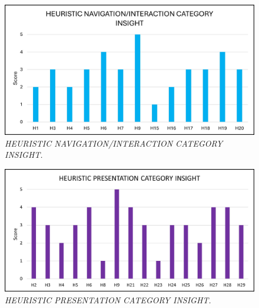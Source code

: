 \begin{figure}[h]
	\includegraphics[width=\textwidth]{Visual_illustration_4.jpg}
	\caption{\textit{HEURISTIC NAVIGATION/INTERACTION CATEGORY INSIGHT.}}
	\label{fig:label4}
\end{figure}
\begin{figure}[h]
	\includegraphics[width=\textwidth]{Visual_illustration_5.jpg}
	\caption{\textit{HEURISTIC PRESENTATION CATEGORY INSIGHT.}}
	\label{fig:label5}
\end{figure}
